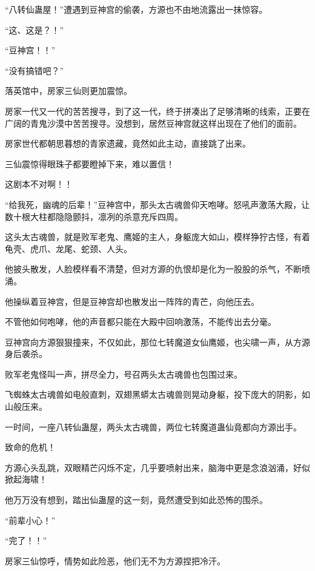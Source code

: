 
\begin{this_body}



“八转仙蛊屋！”遭遇到豆神宫的偷袭，方源也不由地流露出一抹惊容。

“这、这是？！”

“豆神宫！！”

“没有搞错吧？”

落英馆中，房家三仙则更加震惊。

房家一代又一代的苦苦搜寻，到了这一代，终于拼凑出了足够清晰的线索，正要在广阔的青鬼沙漠中苦苦搜寻。没想到，居然豆神宫就这样出现在了他们的面前。

房家世代都朝思暮想的青家遗藏，竟然如此主动，直接跳了出来。

三仙震惊得眼珠子都要瞪掉下来，难以置信！

这剧本不对啊！！

“给我死，幽魂的后辈！”豆神宫中，那头太古魂兽仰天咆哮。怒吼声激荡大殿，让数十根大柱都隐隐颤抖，凛冽的杀意充斥四周。

这头太古魂兽，就是败军老鬼、鹰姬的主人，身躯庞大如山，模样狰狞古怪，有着龟壳、虎爪、龙尾、蛇颈、人头。

他披头散发，人脸模样看不清楚，但对方源的仇恨却是化为一股股的杀气，不断喷涌。

他操纵着豆神宫，但是豆神宫却也散发出一阵阵的青芒，向他压去。

不管他如何咆哮，他的声音都只能在大殿中回响激荡，不能传出去分毫。

豆神宫向方源狠狠撞来，不仅如此，那位七转魔道女仙鹰姬，也尖啸一声，从方源身后袭杀。

败军老鬼怪叫一声，拼尽全力，号召两头太古魂兽也包围过来。

飞蜘蛛太古魂兽如电般直刺，双翅黑蟒太古魂兽则晃动身躯，投下庞大的阴影，如山般压来。

一时间，一座八转仙蛊屋，两头太古魂兽，两位七转魔道蛊仙竟都向方源出手。

致命的危机！

方源心头乱跳，双眼精芒闪烁不定，几乎要喷射出来，脑海中更是念浪汹涌，好似掀起海啸！

他万万没有想到，踏出仙蛊屋的这一刻，竟然遭受到如此恐怖的围杀。

“前辈小心！”

“完了！！”

房家三仙惊呼，情势如此险恶，他们无不为方源捏把冷汗。


\end{this_body}
